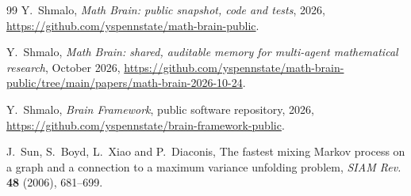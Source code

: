 \documentclass[11pt]{amsart}
\theoremstyle{remark}
\numberwithin{equation}{section}
\begin{document}
\begin{thebibliography}{99}
 Y.~Shmalo, \emph{Math Brain: public snapshot, code and tests}, 2026, \url{https://github.com/yspennstate/math-brain-public}.

 Y.~Shmalo, \emph{Math Brain: shared, auditable memory for multi-agent mathematical research}, October 2026, \url{https://github.com/yspennstate/math-brain-public/tree/main/papers/math-brain-2026-10-24}.

 Y.~Shmalo, \emph{Brain Framework}, public software repository, 2026, \url{https://github.com/yspennstate/brain-framework-public}.

 J.~Sun, S.~Boyd, L.~Xiao and P.~Diaconis, The fastest mixing Markov process on a graph and a connection to a maximum variance unfolding problem, \emph{SIAM Rev.} \textbf{48} (2006), 681--699.

\end{thebibliography}
\end{document}
